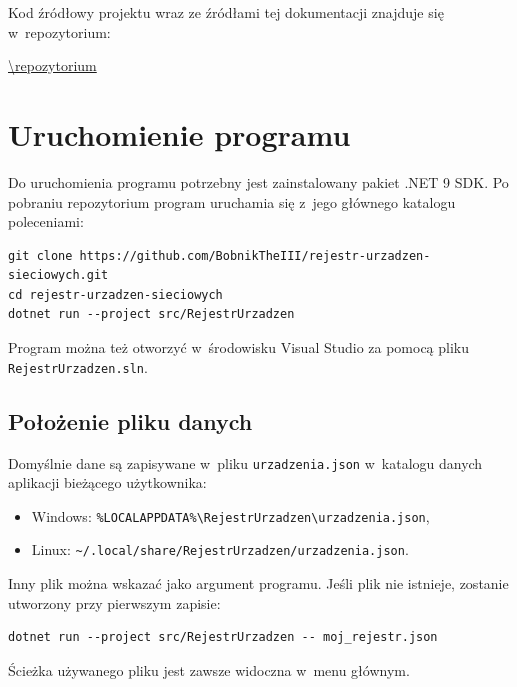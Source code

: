 Kod źródłowy projektu wraz ze źródłami tej dokumentacji znajduje się w~repozytorium:

\begin{center}
	\url{\repozytorium}
\end{center}

\section{Uruchomienie programu}

Do uruchomienia programu potrzebny jest zainstalowany pakiet .NET 9 SDK. Po pobraniu repozytorium program uruchamia się z~jego głównego katalogu poleceniami:

\begin{lstlisting}
git clone https://github.com/BobnikTheIII/rejestr-urzadzen-sieciowych.git
cd rejestr-urzadzen-sieciowych
dotnet run --project src/RejestrUrzadzen
\end{lstlisting}

Program można też otworzyć w~środowisku Visual Studio za pomocą pliku \texttt{RejestrUrzadzen.sln}.

\subsection{Położenie pliku danych}

Domyślnie dane są zapisywane w~pliku \texttt{urzadzenia.json} w~katalogu danych aplikacji bieżącego użytkownika:

\begin{itemize}
	\item Windows: \texttt{\%LOCALAPPDATA\%\textbackslash RejestrUrzadzen\textbackslash urzadzenia.json},
	\item Linux: \texttt{\textasciitilde/.local/share/RejestrUrzadzen/urzadzenia.json}.
\end{itemize}

Inny plik można wskazać jako argument programu. Jeśli plik nie istnieje, zostanie utworzony przy pierwszym zapisie:

\begin{lstlisting}
dotnet run --project src/RejestrUrzadzen -- moj_rejestr.json
\end{lstlisting}

Ścieżka używanego pliku jest zawsze widoczna w~menu głównym.

